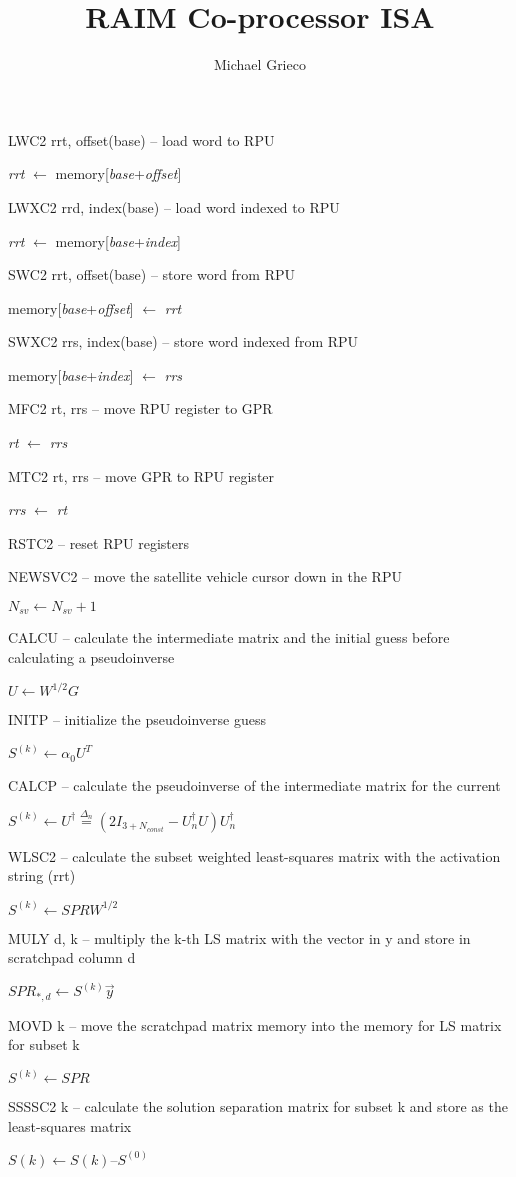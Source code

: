 \documentclass[11pt]{article}
\title{RAIM Co-processor ISA}
\author{Michael Grieco}
\date{}
\begin{document}
LWC2 rrt, offset(base) – load word to RPU

\emph{rrt} $\leftarrow$ memory[\emph{base}+\emph{offset}]

LWXC2 rrd, index(base) – load word indexed to RPU

\emph{rrt} $\leftarrow$ memory[\emph{base}+\emph{index}]

SWC2 rrt, offset(base) – store word from RPU

memory[\emph{base}+\emph{offset}] $\leftarrow$ \emph{rrt}

SWXC2 rrs, index(base) – store word indexed from RPU

memory[\emph{base}+\emph{index}] $\leftarrow$ \emph{rrs}

MFC2 rt, rrs – move RPU register to GPR

\emph{rt} $\leftarrow$ \emph{rrs}

MTC2 rt, rrs – move GPR to RPU register

\emph{rrs} $\leftarrow$ \emph{rt}

RSTC2 – reset RPU registers

NEWSVC2 – move the satellite vehicle cursor down in the RPU

$N_{sv} \leftarrow N_{sv} + 1$

CALCU – calculate the intermediate matrix and the initial guess before calculating a pseudoinverse

$U \leftarrow W^{1/2} G$

INITP – initialize the pseudoinverse guess

$S^{(k)} \leftarrow \alpha_0 U^{T}$

CALCP – calculate the pseudoinverse of the intermediate matrix for the current

$S^{(k)} \leftarrow U^{\dagger} \stackrel{\Delta_n}{=} (2I_{3+N_{const}} - U^{\dagger}_n U) U^{\dagger}_n
$

WLSC2 – calculate the subset weighted least-squares matrix with the activation string (rrt)

$S^{(k)} \leftarrow SPR W^{1/2}$

MULY d, k – multiply the k-th LS matrix with the vector in y and store in scratchpad column d

$SPR_{*,d} \leftarrow S^{(k)} \vec{y}$

MOVD k – move the scratchpad matrix memory into the memory for LS matrix for subset k

$S^{(k)} \leftarrow SPR$

SSSSC2 k – calculate the solution separation matrix for subset k and store as the least-squares matrix

$S{(k)} \leftarrow S{(k)} – S^{(0)}$
\end{document}
